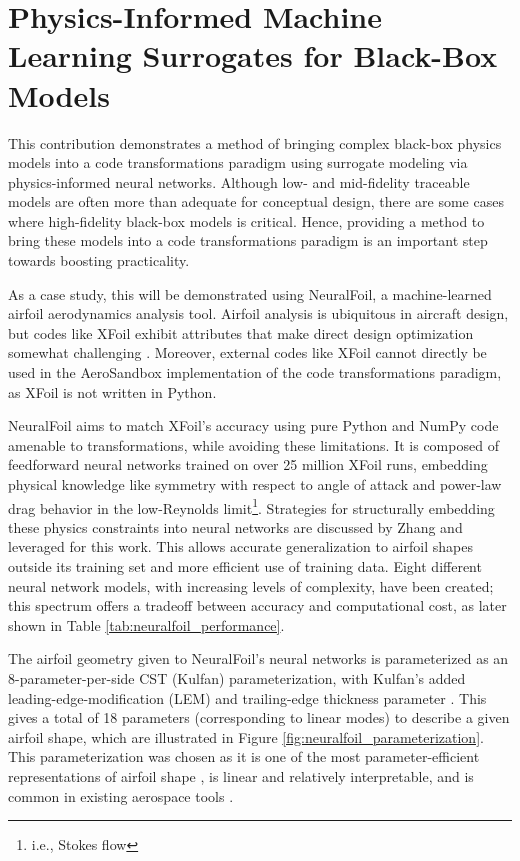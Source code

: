 \documentclass[12pt,vi,oneside,table]{report}
\begin{document}
    \section{Physics-Informed Machine Learning Surrogates for Black-Box Models}
    \label{sec:physics_informed_ml}

    This contribution demonstrates a method of bringing complex black-box physics models into a code transformations paradigm using surrogate modeling via physics-informed neural networks. Although low- and mid-fidelity traceable models are often more than adequate for conceptual design, there are some cases where high-fidelity black-box models is critical. Hence, providing a method to bring these models into a code transformations paradigm is an important step towards boosting practicality.

    As a case study, this will be demonstrated using NeuralFoil, a machine-learned airfoil aerodynamics analysis tool. Airfoil analysis is ubiquitous in aircraft design, but codes like XFoil exhibit attributes that make direct design optimization somewhat challenging \cite{adler_cfd_2022}. Moreover, external codes like XFoil cannot directly be used in the AeroSandbox implementation of the code transformations paradigm, as XFoil is not written in Python.

    NeuralFoil aims to match XFoil's accuracy using pure Python and NumPy code amenable to transformations, while avoiding these limitations. It is composed of feedforward neural networks trained on over 25 million XFoil runs, embedding physical knowledge like symmetry with respect to angle of attack and power-law drag behavior in the low-Reynolds limit\footnote{i.e., Stokes flow}. Strategies for structurally embedding these physics constraints into neural networks are discussed by Zhang \cite{zhang_threedimensional_2022} and leveraged for this work. This allows accurate generalization to airfoil shapes outside its training set and more efficient use of training data. Eight different neural network models, with increasing levels of complexity, have been created; this spectrum offers a tradeoff between accuracy and computational cost, as later shown in Table \ref{tab:neuralfoil_performance}.

    The airfoil geometry given to NeuralFoil's neural networks is parameterized as an 8-parameter-per-side CST (Kulfan) parameterization, with Kulfan's added leading-edge-modification (LEM) and trailing-edge thickness parameter \cite{kulfan_universal_2008, kulfan_modification_2020}. This gives a total of 18 parameters (corresponding to linear modes) to describe a given airfoil shape, which are illustrated in Figure \ref{fig:neuralfoil_parameterization}. This parameterization was chosen as it is one of the most parameter-efficient representations of airfoil shape \cite{masters_geometric_2017}, is linear and relatively interpretable, and is common in existing aerospace tools \cite{mcdonald_open_2022}.
\end{document}
